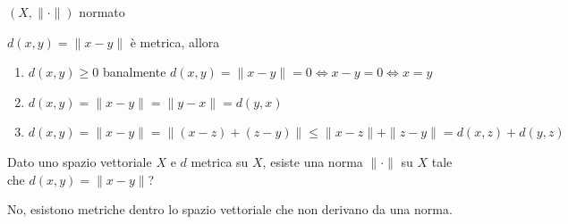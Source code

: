 $(X, \parallel \cdot \parallel)$ normato

$d(x,y)=\parallel x-y \parallel$ è metrica, allora
\begin{enumerate}
	\item $d(x,y)\geq 0$ banalmente 
	$d(x,y) = \parallel x-y \parallel = 0 \iff x-y = 0 \iff x = y$
	\item $d(x,y) = \parallel x-y \parallel = \parallel y-x \parallel = d(y,x)$
	\item $d(x,y) = \parallel x-y \parallel = \parallel (x-z) + (z-y) \parallel \leq \parallel x-z \parallel + \parallel z-y \parallel = d(x,z) + d(y,z)$
\end{enumerate}

Dato uno spazio vettoriale $X$ e $d$ metrica su $X$, esiste una norma $\parallel \cdot \parallel$ su $X$ tale che $d(x,y) = \parallel x-y \parallel$?

No, esistono metriche dentro lo spazio vettoriale che non derivano da una norma.


